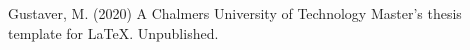 \begin{thebibliography}{69}

 Gustaver, M. (2020) A Chalmers University of Technology Master's thesis template for \LaTeX . Unpublished.

\end{thebibliography}
